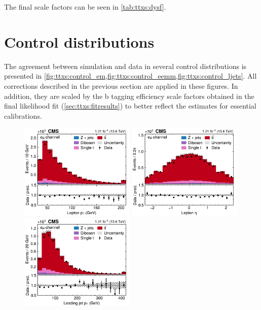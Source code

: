 The final scale factors can be seen in \cref{tab:ttxs:dysf}.

\section{Control distributions}
\label{sec:ttxs:control}

The agreement between simulation and data in several control distributions is presented in \cref{fig:ttxs:control_em,fig:ttxs:control_eemm,fig:ttxs:control_ljets}. All corrections described in the previous section are applied in these figures. In addition, they are scaled by the b tagging efficiency scale factors obtained in the final likelihood fit (\cref{sec:ttxs:fitresults}) to better reflect the estimates for essential calibrations.

\begin{figure}[!hp]
\centering
\includegraphics[width=0.49\textwidth]{figures/ttxs/lep_pt_em.pdf}
\hfill
\includegraphics[width=0.49\textwidth]{figures/ttxs/lep_eta_em.pdf}
\includegraphics[width=0.49\textwidth]{figures/ttxs/1st_jet_pt_em.pdf}

\end{figure}
